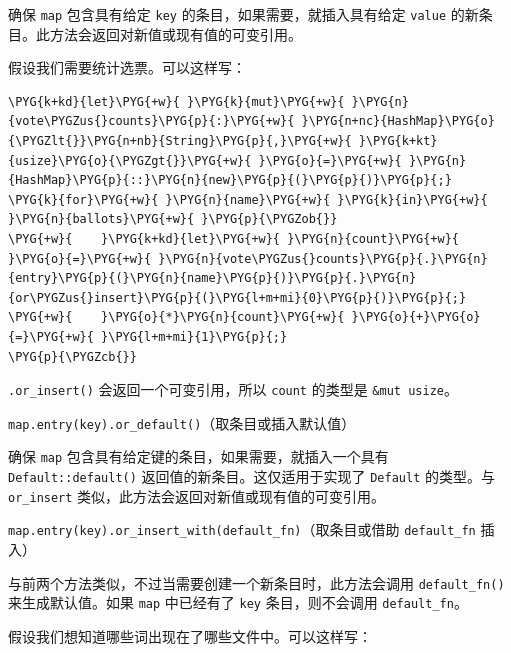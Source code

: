 确保 \texttt{map} 包含具有给定 \texttt{key} 的条目，如果需要，就插入具有给定 \texttt{value} 的新条目。此方法会返回对新值或现有值的可变引用。

假设我们需要统计选票。可以这样写：

\begin{Verbatim}[commandchars=\\\{\},breaklines=true,breakanywhere=true,fontsize=\codefont,xleftmargin=17bp]
\PYG{k+kd}{let}\PYG{+w}{ }\PYG{k}{mut}\PYG{+w}{ }\PYG{n}{vote\PYGZus{}counts}\PYG{p}{:}\PYG{+w}{ }\PYG{n+nc}{HashMap}\PYG{o}{\PYGZlt{}}\PYG{n+nb}{String}\PYG{p}{,}\PYG{+w}{ }\PYG{k+kt}{usize}\PYG{o}{\PYGZgt{}}\PYG{+w}{ }\PYG{o}{=}\PYG{+w}{ }\PYG{n}{HashMap}\PYG{p}{::}\PYG{n}{new}\PYG{p}{(}\PYG{p}{)}\PYG{p}{;}
\PYG{k}{for}\PYG{+w}{ }\PYG{n}{name}\PYG{+w}{ }\PYG{k}{in}\PYG{+w}{ }\PYG{n}{ballots}\PYG{+w}{ }\PYG{p}{\PYGZob{}}
\PYG{+w}{    }\PYG{k+kd}{let}\PYG{+w}{ }\PYG{n}{count}\PYG{+w}{ }\PYG{o}{=}\PYG{+w}{ }\PYG{n}{vote\PYGZus{}counts}\PYG{p}{.}\PYG{n}{entry}\PYG{p}{(}\PYG{n}{name}\PYG{p}{)}\PYG{p}{.}\PYG{n}{or\PYGZus{}insert}\PYG{p}{(}\PYG{l+m+mi}{0}\PYG{p}{)}\PYG{p}{;}
\PYG{+w}{    }\PYG{o}{*}\PYG{n}{count}\PYG{+w}{ }\PYG{o}{+}\PYG{o}{=}\PYG{+w}{ }\PYG{l+m+mi}{1}\PYG{p}{;}
\PYG{p}{\PYGZcb{}}
\end{Verbatim}

\texttt{.or\_insert()} 会返回一个可变引用，所以 \texttt{count} 的类型是 \texttt{\&mut usize}。

\begin{myNote}
\texttt{map.entry(key).or\_default()}（取条目或插入默认值）
\end{myNote}

确保 \texttt{map} 包含具有给定键的条目，如果需要，就插入一个具有 \texttt{Default::default()} 返回值的新条目。这仅适用于实现了 \texttt{Default} 的类型。与 \texttt{or\_insert} 类似，此方法会返回对新值或现有值的可变引用。

\begin{myNote}
\texttt{map.entry(key).or\_insert\_with(default\_fn)}（取条目或借助 \texttt{default\_fn} 插入）
\end{myNote}

与前两个方法类似，不过当需要创建一个新条目时，此方法会调用 \texttt{default\_fn()} 来生成默认值。如果 \texttt{map} 中已经有了 \texttt{key} 条目，则不会调用 \texttt{default\_fn}。

假设我们想知道哪些词出现在了哪些文件中。可以这样写：

